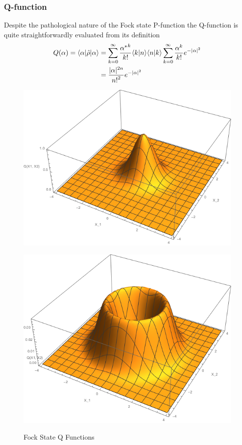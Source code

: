 \subsubsection{Q-function}
Despite the pathological nature of the Fock state P-function the Q-function is quite straightforwardly evaluated from its definition
\begin{align}
	 Q(\alpha) = \langle\alpha | \hat{\rho} | \alpha \rangle  &= \sum_{k=0}^\infty \frac {{\alpha^*}^k}{k!} \langle k | n \rangle\langle n | k \rangle \sum_{k=0}^\infty \frac {\alpha^k}{k!}e^{-|\alpha|^2} \\ &= \frac{|\alpha|^{2n}}{{n!}^2} e^{-|\alpha|^2}
\end{align}
\begin{figure}[h]
	\begin{minipage}[b]{.5\linewidth}
		\centering \large \includegraphics[width=1\textwidth]{Images/Q Function-n=0.png}
		\label{fig:Qn=0}
	\end{minipage}%
	\begin{minipage}[b]{.5\linewidth}
		\centering\large \includegraphics[width = 1\textwidth]{Images/Q Function-n=3.png}
		\label{fig:Qn=5}
	\end{minipage}
	\caption{Fock State Q Functions}\label{Qfunctions}
\end{figure}
